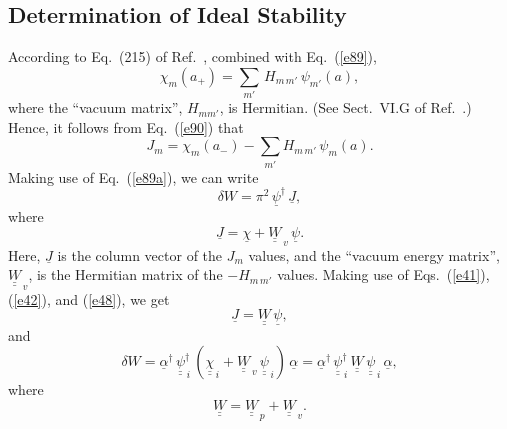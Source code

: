 \documentclass[12pt,prb,aps]{revtex4-1}
\begin{document}
\subsection{Determination of Ideal Stability}\label{stab}
According to Eq.~(215) of Ref.~, combined with Eq.~(\ref{e89}), 
\begin{equation}
\chi_m(a_+)=\sum_{m'}\,H_{m\,m'}\,\psi_{m'}(a),
\end{equation}
where the ``vacuum matrix'', $H_{mm'}$, is Hermitian. (See Sect.~VI.G of Ref.~.)
Hence, it follows from Eq.~(\ref{e90}) that
\begin{equation}
J_m = \chi_m(a_-)-\sum_{m'} H_{m\,m'}\,\psi_m(a).
\end{equation}
Making use of Eq.~(\ref{e89a}), we can write
\begin{equation}
\delta W =\pi^2\, \underline{\psi}^\dag\,\underline{J},
\end{equation}
where 
\begin{equation}
\underline{J} = \underline{\chi}+ \underline{\underline{W}}_{\,v}\,\underline{\psi}.
\end{equation}
Here,  $\underline{J}$ is the column vector of the $J_m$ values, 
and the ``vacuum energy matrix'', $\underline{\underline{W}}_{\,v}$,  is the Hermitian matrix of the $-H_{m\,m'}$ values. 
Making use of Eqs.~(\ref{e41}), (\ref{e42}), and (\ref{e48}), we get 
\begin{equation}
\underline{J} = \underline{\underline{W}}\,\underline{\psi},
\end{equation}
and
\begin{equation}
\delta W = \underline{\alpha}^\dag\,\underline{\underline{\psi}}^{\dag}_{\,i}\,(\underline{\underline{\chi}}_{\,i} + \underline{\underline{W}}_{\,v}\,\underline{\underline{\psi}}_{\,i})\,\underline{\alpha}=  \underline{\alpha}^\dag\,\underline{\underline{\psi}}^{\dag}_{\,i}\,\underline{\underline{W}}\,\underline{\underline{\psi}}_{\,i}\,\underline{\alpha},
\end{equation}
where
\begin{equation}
\underline{\underline{W}}=\underline{\underline{W}}_{\,p}+\underline{\underline{W}}_{\,v}.
\end{equation}
\end{document}
